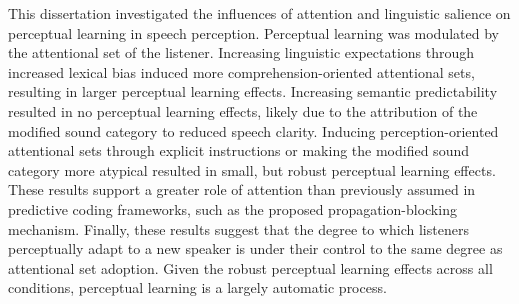 This dissertation investigated the influences of attention and linguistic salience on perceptual learning in speech perception.
Perceptual learning was modulated by the attentional set of the listener.
Increasing linguistic expectations through increased lexical bias induced more comprehension-oriented attentional sets, resulting in larger perceptual learning effects.
Increasing semantic predictability resulted in no perceptual learning effects, likely due to the attribution of the modified sound category to reduced speech clarity.
Inducing perception-oriented attentional sets through explicit instructions or making the modified sound category more atypical resulted in small, but robust perceptual learning effects.
These results support a greater role of attention than previously assumed in predictive coding frameworks, such as the proposed propagation-blocking mechanism.
Finally, these results suggest that the degree to which listeners perceptually adapt to a new speaker is under their control to the same degree as attentional set adoption.
Given the robust perceptual learning effects across all conditions, perceptual learning is a largely automatic process.



